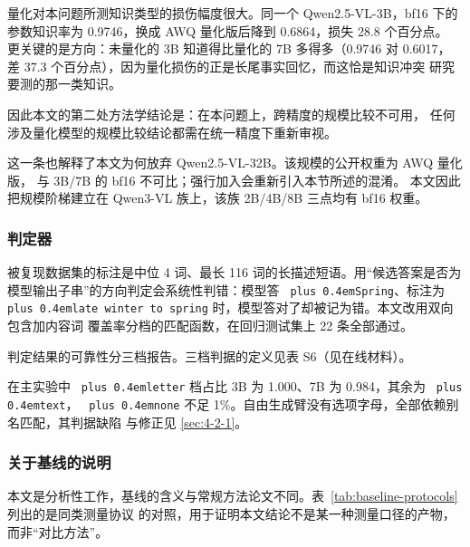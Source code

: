 \documentclass[10.5pt,compsoc,UTF8]{CjC}
\theoremstyle{mystyle}
\DeclareRobustCommand{\code}[1]{\texttt{\spaceskip=0pt plus 0.4em\relax#1}}
\DeclareRobustCommand{\codesplit}[1]{\texttt{\spaceskip=0pt plus 0.4em\relax#1}}
\begin{document}
量化对本问题所测知识类型的损伤幅度很大。同一个 Qwen2.5-VL-3B，bf16 下的
参数知识率为 0.9746，换成 AWQ 量化版后降到 0.6864，损失 28.8 个百分点。
更关键的是方向：未量化的 3B 知道得比量化的 7B 多得多（0.9746 对 0.6017，
差 37.3 个百分点），因为量化损伤的正是长尾事实回忆，而这恰是知识冲突
研究要测的那一类知识。

因此本文的第二处方法学结论是：在本问题上，跨精度的规模比较不可用，
任何涉及量化模型的规模比较结论都需在统一精度下重新审视。

这一条也解释了本文为何放弃 Qwen2.5-VL-32B。该规模的公开权重为 AWQ 量化版，
与 3B/7B 的 bf16 不可比；强行加入会重新引入本节所述的混淆。
本文因此把规模阶梯建立在 Qwen3-VL 族上，该族 2B/4B/8B 三点均有 bf16 权重。

\subsubsection{判定器}
\label{sec:4-3-5}

被复现数据集的标注是中位 4 词、最长 116 词的长描述短语。用“候选答案是否为
模型输出子串”的方向判定会系统性判错：模型答 \code{Spring}、标注为
\codesplit{l\allowbreak{}a\allowbreak{}t\allowbreak{}e\allowbreak{} w\allowbreak{}i\allowbreak{}n\allowbreak{}t\allowbreak{}e\allowbreak{}r\allowbreak{} t\allowbreak{}o\allowbreak{} s\allowbreak{}p\allowbreak{}r\allowbreak{}i\allowbreak{}n\allowbreak{}g\allowbreak{}} 时，模型答对了却被记为错。本文改用双向包含加内容词
覆盖率分档的匹配函数，在回归测试集上 22 条全部通过。

判定结果的可靠性分三档报告。三档判据的定义见表 S6（见在线材料）。

在主实验中 \code{letter} 档占比 3B 为 1.000、7B 为 0.984，其余为 \code{text}，
\code{none} 不足 1\%。自由生成臂没有选项字母，全部依赖别名匹配，其判据缺陷
与修正见 \ref{sec:4-2-1}。

\subsubsection{关于基线的说明}
\label{sec:4-3-6}

本文是分析性工作，基线的含义与常规方法论文不同。表~\ref{tab:baseline-protocols} 列出的是同类测量协议
的对照，用于证明本文结论不是某一种测量口径的产物，而非“对比方法”。
\end{document}
